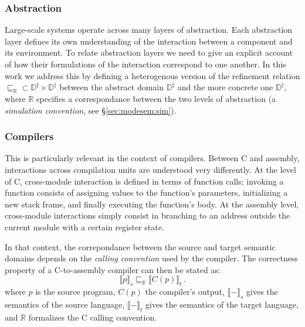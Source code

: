 \documentclass[sigplan,10pt,review,anonymous]{acmart}
\begin{document}

\subsubsection{Abstraction} %

Large-scale systems operate across many layers of abstraction.
Each abstraction layer defines its own understanding of the interaction
between a component and its environment.
To relate abstraction layers we need to give
an explicit account of how their formulations of the interaction
correspond to one another.
\cbstart
In this work we address this by defining a heterogenous version
of the refinement relation
${\sqsubseteq_\mathbb{R}} \subset
 \mathbb{D}^\sharp \times \mathbb{D}^\natural$ between
the abstract domain $\mathbb{D}^\sharp$ and
the more concrete one $\mathbb{D}^\natural$, where 
$\mathbb{R}$ specifies a correspondance between
the two levels of abstraction
(a \emph{simulation convention}, see \S\ref{sec:modesem:sim}).
\cbend



\subsubsection{Compilers} %

This is particularly relevant
in the context of compilers.
Between C and assembly,
interactions across compilation units
are understood very differently.
At the level of C,
cross-module interaction is defined in terms of
function calls;
invoking a function consists of assigning values
to the function's parameters,
initializing a new stack frame,
and finally executing the function's body.
At the assembly level, cross-module
interactions simply consist in branching to an address
outside the current module with
a certain register state.

\cbstart
In that context,
the correpondance between the source and target semantic domains
depends on the \emph{calling convention} used by the compiler.
The correctness property of a C-to-assembly compiler
can then be stated as:
\[ \llbracket p \rrbracket_s \sqsubseteq_\mathbb{R}
   \llbracket C(p) \rrbracket_t \,. \]
where
$p$ is the source program, $C(p)$ the compiler's output,
$\llbracket - \rrbracket_s$ gives the semantics of the source language,
$\llbracket - \rrbracket_t$ gives the semantics of the target language,
and $\mathbb{R}$ formalizes the C calling convention.
\cbend
\end{document}
